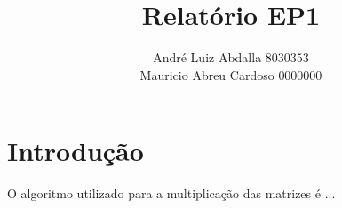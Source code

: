 \documentclass[11pt]{article}
\author{André Luiz Abdalla $8030353$ \\ Mauricio Abreu Cardoso $0000000$}
\title{Relatório EP1}
\begin{document}
    \maketitle

    \section{Introdução}

    O algoritmo utilizado para a multiplicação das matrizes é ...
\end{document}

